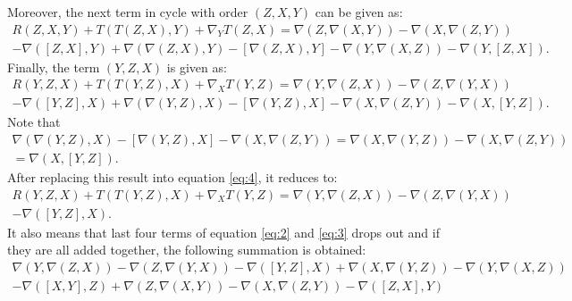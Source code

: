 \documentclass[11pt]{amsart}
\begin{document}
Moreover, the next term in cycle with order $(Z,X,Y)$ can be given as:
\begin{equation}
\label{eq:3}
\begin{split}
R(Z,X,Y)+T(T(Z,X),Y)+\nabla_{Y}T(Z,X)=\nabla(Z,\nabla(X,Y))-\nabla(X,\nabla(Z,Y))
\\
-\nabla(\left [ Z,X \right ],Y)+\nabla(\nabla(Z,X),Y)-\left [ \nabla(Z,X),Y \right ]
-\nabla(Y,\nabla(X,Z))-\nabla(Y,\left [ Z,X \right ]).
\end{split}
\end{equation}
Finally, the term $(Y,Z,X)$ is given as:
\begin{equation}
\label{eq:4}
\begin{split}
R(Y,Z,X)+T(T(Y,Z),X)+\nabla_{X}T(Y,Z)=\nabla(Y,\nabla(Z,X))-\nabla(Z,\nabla(Y,X))
\\
-\nabla(\left [ Y,Z \right ],X)+\nabla(\nabla(Y,Z),X)-\left [ \nabla(Y,Z),X \right ]
-\nabla(X,\nabla(Z,Y))-\nabla(X,\left [ Y,Z \right ]).
\end{split}
\end{equation}
Note that
\begin{equation}
\label{eq:5}
\begin{split}
\nabla(\nabla(Y,Z),X)-\left [ \nabla(Y,Z),X \right ]
-\nabla(X,\nabla(Z,Y))=\nabla(X,\nabla(Y,Z))-\nabla(X,\nabla(Z,Y))
\\
=\nabla(X,\left[ Y,Z \right ]).
\end{split}
\end{equation}
After replacing this result into equation \ref{eq:4}, it reduces to:
\begin{equation}
\label{eq:6}
\begin{split}
R(Y,Z,X)+T(T(Y,Z),X)+\nabla_{X}T(Y,Z)=\nabla(Y,\nabla(Z,X))-\nabla(Z,\nabla(Y,X))
\\
-\nabla(\left [ Y,Z \right ],X).
\end{split}
\end{equation}
It also means that last four terms of equation \ref{eq:2} and \ref{eq:3} drops out and if they are all added together, the following  summation is obtained:
\begin{equation}
\label{eq:7}
\begin{split}
\nabla(Y,\nabla(Z,X))-\nabla(Z,\nabla(Y,X))-\nabla(\left [ Y,Z \right ],X)+\nabla(X,\nabla(Y,Z))-\nabla(Y,\nabla(X,Z))
\\
-\nabla(\left [ X,Y \right ],Z)+\nabla(Z,\nabla(X,Y))-\nabla(X,\nabla(Z,Y))-\nabla(\left [ Z,X \right ],Y)
\end{split}
\end{equation}
\end{document}
